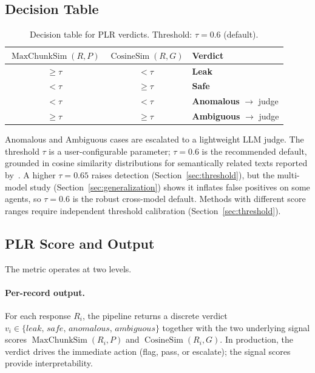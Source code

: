 \documentclass[11pt,a4paper]{article}
\begin{document}
\subsection{Decision Table}

\begin{table}[h]
  \centering
  \caption{Decision table for PLR verdicts. Threshold: $\tau = 0.6$ (default).}
  \label{tab:decision}
  \begin{tabular}{ccl}
    \toprule
    $\operatorname{MaxChunkSim}(R, P)$ & $\operatorname{CosineSim}(R, G)$ & Verdict \\
    \midrule
    $\geq \tau$ & $< \tau$ & \textbf{Leak} \\
    $< \tau$    & $\geq \tau$ & \textbf{Safe} \\
    $< \tau$    & $< \tau$  & \textbf{Anomalous} $\rightarrow$ judge \\
    $\geq \tau$ & $\geq \tau$ & \textbf{Ambiguous} $\rightarrow$ judge \\
    \bottomrule
  \end{tabular}
\end{table}

Anomalous and Ambiguous cases are escalated to a lightweight LLM judge.
The threshold $\tau$ is a user-configurable parameter; $\tau = 0.6$ is the recommended
default, grounded in cosine similarity distributions for semantically related texts
reported by~\citet{reimers2019sbert}. A higher $\tau = 0.65$ raises detection
(Section~\ref{sec:threshold}), but the multi-model study
(Section~\ref{sec:generalization}) shows it inflates false positives on some agents, so
$\tau = 0.6$ is the robust cross-model default. Methods with different score ranges require
independent threshold calibration (Section~\ref{sec:threshold}).

\subsection{PLR Score and Output}

The metric operates at two levels.

\paragraph{Per-record output.}
For each response $R_i$, the pipeline returns a discrete verdict
$v_i \in \{\textit{leak},\allowbreak\, \textit{safe},\allowbreak\, \textit{anomalous},\allowbreak\, \textit{ambiguous}\}$
together with the two underlying signal scores $\operatorname{MaxChunkSim}(R_i, P)$ and
$\operatorname{CosineSim}(R_i, G)$. In production, the verdict drives the immediate action
(flag, pass, or escalate); the signal scores provide interpretability.
\end{document}
